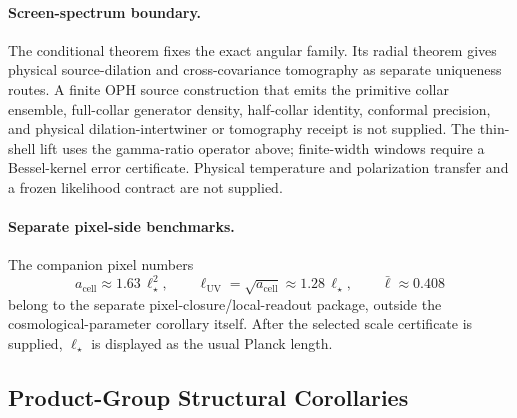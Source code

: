 \paragraph{Screen-spectrum boundary.}
The conditional theorem fixes the exact angular family. Its radial theorem gives physical
source-dilation and cross-covariance tomography as separate uniqueness routes. A finite OPH source
construction that emits the primitive collar ensemble, full-collar generator density, half-collar identity,
conformal precision, and physical dilation-intertwiner or tomography receipt is not supplied.
The thin-shell lift uses the gamma-ratio operator above;
finite-width windows require a Bessel-kernel error certificate. Physical
temperature and polarization transfer and a frozen likelihood contract are
not supplied.

\paragraph{Separate pixel-side benchmarks.}
The companion pixel numbers
\[
a_{\mathrm{cell}}\approx 1.63\,\ell_\star^2,
\qquad
\ell_{\mathrm{UV}}=\sqrt{a_{\mathrm{cell}}}\approx 1.28\,\ell_\star,
\qquad
\bar{\ell}\approx 0.408
\]
belong to the separate pixel-closure/local-readout package, outside the cosmological-parameter corollary itself. After the selected scale certificate is supplied, \(\ell_\star\) is displayed as the usual Planck length.

\fi
\ifdefined\OPHSkipStandardModelChain
\else
\subsection{Product-Group Structural Corollaries}

